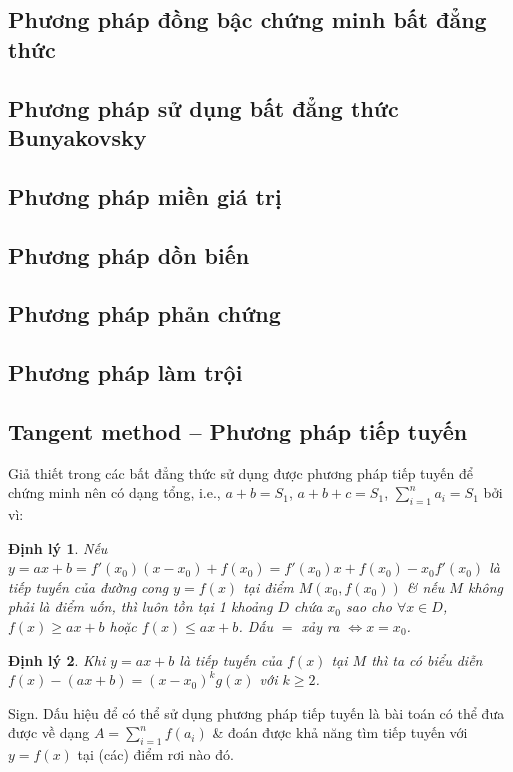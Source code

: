 \documentclass{article}
\newtheorem{dinhly}{Định lý}
\begin{document}
\subsection{Phương pháp đồng bậc chứng minh bất đẳng thức}

\subsection{Phương pháp sử dụng bất đẳng thức Bunyakovsky}

\subsection{Phương pháp miền giá trị}

\subsection{Phương pháp dồn biến}

\subsection{Phương pháp phản chứng}

\subsection{Phương pháp làm trội}

\subsection{Tangent method -- Phương pháp tiếp tuyến}
Giả thiết trong các bất đẳng thức sử dụng được phương pháp tiếp tuyến để chứng minh nên có dạng tổng, i.e., $a + b = S_1$, $a + b + c = S_1$, $\sum_{i=1}^n a_i = S_1$ bởi vì:

\begin{dinhly}
	Nếu $y = ax + b = f'(x_0)(x - x_0) + f(x_0) = f'(x_0)x + f(x_0) - x_0f'(x_0)$ là tiếp tuyến của đường cong $y = f(x)$ tại điểm $M(x_0,f(x_0))$ \& nếu $M$ không phải là điểm uốn, thì luôn tồn tại 1 khoảng $D$ chứa $x_0$ sao cho $\forall x\in D$, $f(x)\ge ax + b$ hoặc $f(x)\le ax + b$. Dấu $=$ xảy ra $\Leftrightarrow x = x_0$.
\end{dinhly}

\begin{dinhly}
	Khi $y = ax + b$ là tiếp tuyến của $f(x)$ tại $M$ thì ta có biểu diễn $f(x) - (ax + b) = (x - x_0)^kg(x)$ với $k\ge2$.
\end{dinhly}
{\sf Sign.} Dấu hiệu để có thể sử dụng phương pháp tiếp tuyến là bài toán có thể đưa được về dạng $A = \sum_{i=1}^n f(a_i)$ \& đoán được khả năng tìm tiếp tuyến với $y = f(x)$ tại (các) điểm rơi nào đó.
\end{document}
